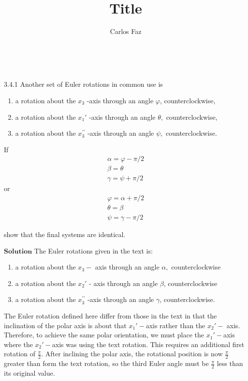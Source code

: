 \documentclass{article}
\title{Title}
\author{Carlos Faz}
\date{ \ }
\begin{document}
\begin{flushleft}




\begin{mybox}{3.4.1}
Another set of Euler rotations in common use is
\begin{enumerate}[$(a)$]
\item a rotation about the $x_{3}$ -axis through an angle $\varphi$, counterclockwise,
\item a rotation about the $x_{1}'$ -axis through an angle $\theta,$ counterclockwise,
\item a rotation about the $x_{3}^{\prime \prime}$ -axis through an angle $\psi,$ counterclockwise. 
\end{enumerate}
\begin{multicols}{2}
If 
$$
\begin{array}{l}
\alpha=\varphi-\pi / 2 \\
\beta=\theta \\
\gamma=\psi+\pi / 2
\end{array}
$$
or
$$
\begin{array}{l}
\varphi=\alpha+\pi / 2 \\
\theta=\beta \\
\psi=\gamma-\pi / 2
\end{array}
$$
\end{multicols}
show that the final systems are identical.
\end{mybox}

$\boxed{\textbf{Solution}}$ The Euler rotations given in the text is:
\begin{enumerate}
\item a rotation about the $x_{3}-$ axis through an angle $\alpha,$ counterclockwise
\item a rotation about the $x_{2}'$ - axis through an angle $\beta$, counterclockwise
\item a rotation about the $x_{3}^{\prime \prime}$ -axis through an angle $\gamma$, counterclockwise.
\end{enumerate}
The Euler rotation defined here differ from those in the text in that the inclination of the polar axis is about that $x_{1}'-$axis rather than the $x_{2}'-$ axis. Therefore, to achieve the same polar orientation, we must place the $x_{1}'-$axis where the $x_{2}'-$axis was using the text rotation. This requires an additional first rotation of $\frac{\pi}{2}$. After inclining the polar axis, the rotational position
is now $\frac{\pi}{2}$ greater than form the text rotation, so the third Euler angle must be $\frac{\pi}{2}$ less than its original value.




\end{flushleft}
\end{document}
